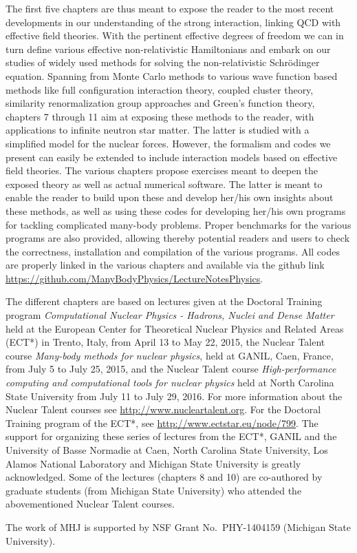 The first five chapters are thus meant to
expose the reader to the most recent developments in our understanding
of the strong interaction, linking QCD with effective field
theories. With the pertinent effective degrees of freedom we can in
turn define various effective non-relativistic Hamiltonians and embark
on our studies of widely used methods for solving the non-relativistic
Schr\"odinger equation. Spanning from Monte Carlo methods to various
wave function based methods like full configuration interaction
theory, coupled cluster theory, similarity renormalization group
approaches and Green's function theory, chapters 7 through 11 aim at
exposing these methods to the reader, with applications to infinite neutron star
matter. The latter is studied with a simplified model for the nuclear
forces. However, the formalism and codes we present can easily be
extended to include interaction models based on effective field
theories.  The various chapters propose exercises meant to deepen the
exposed theory as well as actual numerical software.  The latter is
meant to enable the reader to build upon these and develop her/his own
insights about these methods, as well as using these codes for
developing her/his own programs for tackling complicated many-body
problems.  Proper benchmarks for the various programs are also
provided, allowing thereby potential readers and users to check the
correctness, installation and compilation of the various programs. All
codes are properly linked in the various chapters and available via
the github
link \url{https://github.com/ManyBodyPhysics/LectureNotesPhysics}.


\begin{acknowledgement}
The different chapters are based on lectures given at the Doctoral Training program {\em Computational Nuclear Physics - Hadrons, Nuclei and Dense Matter} held at  the European Center for Theoretical Nuclear Physics
and Related Areas (ECT*) in Trento, Italy, from April 13 to May 22, 2015, the Nuclear Talent course {\em Many-body methods for nuclear physics}, held at GANIL, Caen, France, from July 5 to July 25,  2015, and the Nuclear Talent course {\em High-performance computing and computational tools for nuclear physics} held at North Carolina State University from July 11 to July 29, 2016. For more information about the Nuclear Talent courses see \url{http://www.nucleartalent.org}. For the Doctoral Training program of the ECT*, see \url{http://www.ectstar.eu/node/799}.
The support for organizing these series of lectures from the ECT*, GANIL and the University of Basse Normadie at Caen, North Carolina State University, Los Alamos National Laboratory and Michigan State University is greatly acknowledged.   Some of the lectures (chapters 8 and 10) are co-authored by graduate students (from Michigan State University) who  attended the abovementioned Nuclear Talent courses.


The work of MHJ is supported by NSF Grant No.~PHY-1404159 (Michigan State University). 
\end{acknowledgement}

